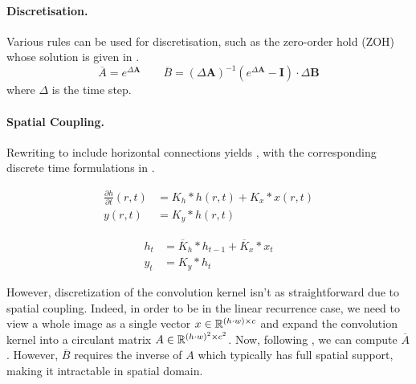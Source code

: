 \paragraph{Discretisation.} Various rules can be used for discretisation, such as the zero-order hold (ZOH) whose solution is given in .
\begin{equation}
\label{eq:zoh}
\overline{A} = e^{\Delta \bm{A}}
\qquad
\overline{B} = (\Delta \bm{A})^{-1} (e^{\Delta \bm{A}} - \bm{I}) \cdot \Delta \bm{B}
\end{equation}
where $\Delta$ is the time step.

\paragraph{Spatial Coupling.} Rewriting  to include horizontal connections yields , with the corresponding discrete time formulations in .

\begin{minipage}[t]{.45\linewidth}
  \begin{subequations}
    \label{eq:conv_ssm_continuous}
    \begin{align}
    \label{eq:conv_ssm_continuous:1}
      \frac{\partial h}{\partial t}(r,t) &= K_h \ast h(r, t) + K_x \ast x(r, t) \\
      y(r, t) &= K_y \ast h(r, t)
    \end{align}
  \end{subequations}
\end{minipage}%
\begin{minipage}[t]{.45\linewidth}
  \begin{subequations}
    \label{eq:conv_ssm_discrete}
    \begin{align}
    \label{eq:conv_ssm_discrete:1}
      h_{t} &= \overline{K}_h \ast h_{t-1} + \overline{K}_x \ast x_t \\
    \label{eq:conv_ssm_discrete:2}
      y_t &= K_y \ast h_t
    \end{align}
  \end{subequations}
\end{minipage}

However, discretization of the convolution kernel isn't as straightforward due to spatial coupling. Indeed, in order to be in the linear recurrence case, we need to view a whole image as a single vector $x\in \mathbb{R}^{(h\cdot w) \times c}$ and expand the convolution kernel into a circulant matrix $A \in \mathbb{R}^{(h\cdot w)^2 \times c^2}$. Now, following , we can compute $\overline{A}$. However, $\overline{B}$ requires the inverse of $A$ which typically has full spatial support, making it intractable in spatial domain.

